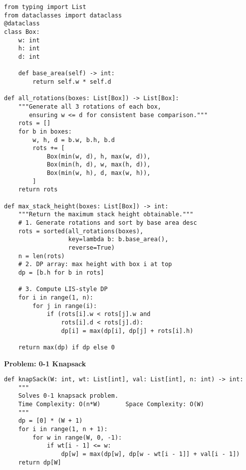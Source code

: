 \begin{verbatim}
from typing import List
from dataclasses import dataclass
@dataclass
class Box:
    w: int
    h: int
    d: int

    def base_area(self) -> int:
        return self.w * self.d

def all_rotations(boxes: List[Box]) -> List[Box]:
    """Generate all 3 rotations of each box, 
       ensuring w <= d for consistent base comparison."""
    rots = []
    for b in boxes:
        w, h, d = b.w, b.h, b.d
        rots += [
            Box(min(w, d), h, max(w, d)),
            Box(min(h, d), w, max(h, d)),
            Box(min(w, h), d, max(w, h)),
        ]
    return rots

def max_stack_height(boxes: List[Box]) -> int:
    """Return the maximum stack height obtainable."""
    # 1. Generate rotations and sort by base area desc
    rots = sorted(all_rotations(boxes), 
                  key=lambda b: b.base_area(), 
                  reverse=True)
    n = len(rots)
    # 2. DP array: max height with box i at top
    dp = [b.h for b in rots]

    # 3. Compute LIS-style DP
    for i in range(1, n):
        for j in range(i):
            if (rots[i].w < rots[j].w and
                rots[i].d < rots[j].d):
                dp[i] = max(dp[i], dp[j] + rots[i].h)

    return max(dp) if dp else 0
\end{verbatim}
\noindent\textbf{Problem: 0-1 Knapsack}
\begin{verbatim}
def knapSack(W: int, wt: List[int], val: List[int], n: int) -> int:
    """
    Solves 0-1 knapsack problem.
    Time Complexity: O(n*W)       Space Complexity: O(W)
    """
    dp = [0] * (W + 1)
    for i in range(1, n + 1):
        for w in range(W, 0, -1):
            if wt[i - 1] <= w:
                dp[w] = max(dp[w], dp[w - wt[i - 1]] + val[i - 1])
    return dp[W]
\end{verbatim}

